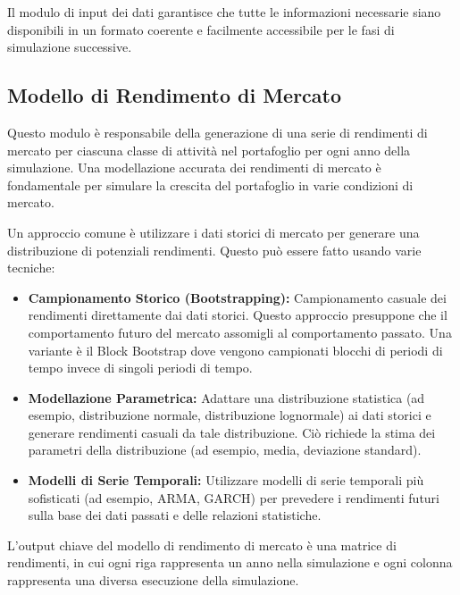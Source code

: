     Il modulo di input dei dati garantisce che tutte le informazioni necessarie
    siano disponibili in un formato coerente e facilmente accessibile per le
    fasi di simulazione successive.

    \subsection{Modello di Rendimento di
    Mercato}\label{subsec:modello-di-rendimento-di-mercato}

Questo modulo è responsabile della generazione di una serie di rendimenti di
mercato per ciascuna classe di attività nel portafoglio per ogni anno della
simulazione.
Una modellazione accurata dei rendimenti di mercato è fondamentale
per simulare la crescita del portafoglio in varie condizioni di mercato.

    Un approccio comune è utilizzare i dati storici di mercato per generare una
    distribuzione di potenziali rendimenti.
    Questo può essere fatto usando varie
    tecniche:
    \begin{itemize}
        \item \textbf{Campionamento Storico (Bootstrapping):} Campionamento
        casuale dei rendimenti direttamente dai dati storici.
        Questo approccio
        presuppone che il comportamento futuro del mercato assomigli al
        comportamento passato.
        Una variante è il Block Bootstrap dove vengono
        campionati blocchi di periodi di tempo invece di singoli periodi di
        tempo.
        \item \textbf{Modellazione Parametrica:} Adattare una distribuzione
        statistica (ad esempio, distribuzione normale, distribuzione lognormale)
        ai dati storici e generare rendimenti casuali da tale distribuzione.
        Ciò
        richiede la stima dei parametri della distribuzione (ad esempio, media,
        deviazione standard).
        \item \textbf{Modelli di Serie Temporali:} Utilizzare modelli di serie
        temporali più sofisticati (ad esempio, ARMA, GARCH) per prevedere i
        rendimenti futuri sulla base dei dati passati e delle relazioni
        statistiche.
    \end{itemize}

    L'output chiave del modello di rendimento di mercato è una matrice di
    rendimenti, in cui ogni riga rappresenta un anno nella simulazione e ogni
    colonna rappresenta una diversa esecuzione della simulazione.

